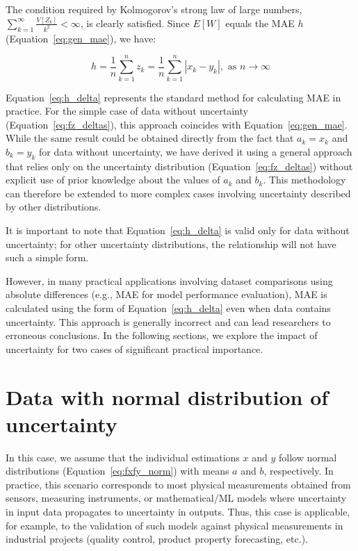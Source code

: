 \documentclass[12pt,a4paper]{article}
\theoremstyle{definition}
\begin{document}
The condition required by Kolmogorov's strong law of large numbers, $\sum\limits_{k=1}^{\infty}\frac{V[Z_k]}{k^2} < \infty$, is clearly satisfied. Since $E\left[W\right]$ equals the MAE $h$ (Equation~\ref{eq:gen_mae}), we have:

\begin{equation}
	h = \frac{1}{n} \sum\limits_{k=1}^{n} z_k = \frac{1}{n} \sum\limits_{k=1}^{n} |x_k-y_k|, \text{ as } n\to\infty
	\label{eq:h_delta}
\end{equation}

Equation~\ref{eq:h_delta} represents the standard method for calculating MAE in practice. For the simple case of data without uncertainty (Equation~\ref{eq:fz_deltas}), this approach coincides with Equation~\ref{eq:gen_mae}. While the same result could be obtained directly from the fact that $a_k=x_k$ and $b_k=y_k$ for data without uncertainty, we have derived it using a general approach that relies only on the uncertainty distribution (Equation~\ref{eq:fz_deltas}) without explicit use of prior knowledge about the values of $a_k$ and $b_k$. This methodology can therefore be extended to more complex cases involving uncertainty described by other distributions.

It is important to note that Equation~\ref{eq:h_delta} is valid only for data without uncertainty; for other uncertainty distributions, the relationship will not have such a simple form.

However, in many practical applications involving dataset comparisons using absolute differences (e.g., MAE for model performance evaluation), MAE is calculated using the form of Equation~\ref{eq:h_delta} even when data contains uncertainty. This approach is generally incorrect and can lead researchers to erroneous conclusions. In the following sections, we explore the impact of uncertainty for two cases of significant practical importance.

\section{Data with normal distribution of uncertainty}

In this case, we assume that the individual estimations $x$ and $y$ follow normal distributions (Equation~\ref{eq:fxfy_norm}) with means $a$ and $b$, respectively. In practice, this scenario corresponds to most physical measurements obtained from sensors, measuring instruments, or mathematical/ML models where uncertainty in input data propagates to uncertainty in outputs. Thus, this case is applicable, for example, to the validation of such models against physical measurements in industrial projects (quality control, product property forecasting, etc.).
\end{document}
